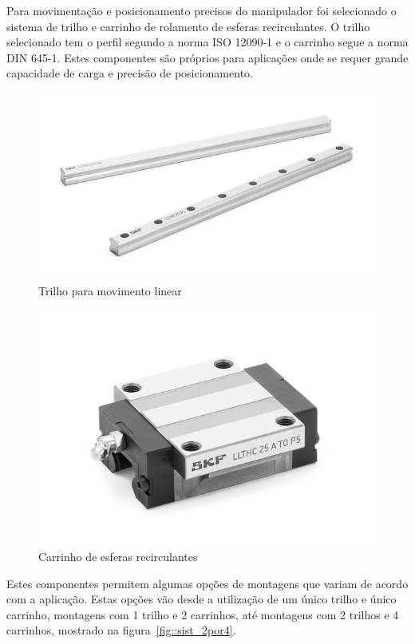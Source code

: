 Para movimentação e posicionamento precisos do manipulador foi selecionado o
sistema de trilho e carrinho de rolamento de esferas recirculantes. 
O trilho selecionado tem o perfil segundo a norma ISO 12090-1 e o carrinho segue
a norma DIN 645-1. 
Estes componentes são próprios para aplicações onde se requer grande capacidade
de carga e precisão de posicionamento.

\begin{figure}[H]
	\centering
	\includegraphics[width=0.7\columnwidth]{figs/construcao/trilho_LLT}
	\caption{Trilho para movimento linear}
    \label{fig::trilho}
\end{figure}

\begin{figure}[H]
	\centering
	\includegraphics[width=0.7\columnwidth]{figs/construcao/carrinho}
	\caption{Carrinho de esferas recirculantes}
    \label{fig::carrinho}
\end{figure}

Estes componentes permitem algumas opções de montagens que variam de acordo com
a aplicação. 
Estas opções vão desde a utilização de um único trilho e único carrinho,
montagens com 1 trilho e 2 carrinhos, até montagens com 2 trilhos e 4 carrinhos,
mostrado na figura~\ref{fig::sist_2por4}.

